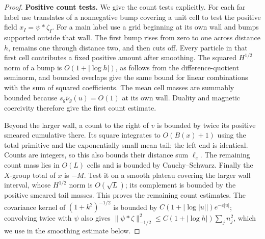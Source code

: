 \begin{proof}
\par\smallskip\noindent\textbf{Positive count tests.}
We give the count tests explicitly. For each far label use translates
of a nonnegative bump covering a unit cell to test the positive field
$x_I=\psi*\zeta_I$. For a main label use a grid beginning at its own
wall and bumps supported outside that wall. The first bump rises from
zero to one across distance $h$, remains one through distance two,
and then cuts off. Every particle in that first cell contributes a
fixed positive amount after smoothing. The squared $H^{1/2}$ norm
of a bump is $O(1+|\log h|)$, as follows from the difference-quotient
seminorm, and bounded overlaps give the same bound for linear
combinations with the sum of squared coefficients. The mean cell
masses are summably bounded because $s_g\bar\nu_g(u)=O(1)$ at
its own wall. Duality and magnetic coercivity therefore give the
first count estimate.

Beyond the larger wall, a count to the right of $v$ is bounded by
twice its positive smeared cumulative there. Its square integrates
to $O(B(x)+1)$ using the total primitive and the exponentially small
mean tail; the left end is identical. Counts are integers, so this
also bounds their distance sum $\ell_e$. The remaining count mass
lies in $O(L)$ cells and is bounded by Cauchy--Schwarz. Finally the
$X$-group total of $x$ is $-M$. Test it on a smooth plateau covering
the larger wall interval, whose $H^{1/2}$ norm is $O(\sqrt L)$;
its complement is bounded by the positive smeared tail masses.
This proves the remaining count estimates. The covariance kernel
of $(1+k^2)^{-1/2}$ is bounded by
$C(1+|\log|u||)e^{-c|u|}$; convolving twice with $\psi$ also gives
$\|\psi*\zeta\|_{-1/2}^2\le C(1+|\log h|)\sum_j n_j^2$,
which we use in the smoothing estimate below.


\end{proof}
